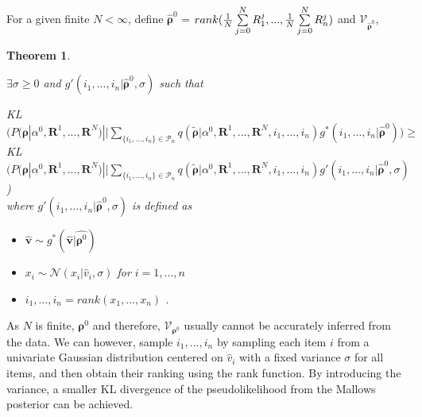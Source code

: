 \documentclass[11pt, oneside]{article}   	%
\newtheorem{theorem}{Theorem}[subsection]
\begin{document}
\subsection{ }
For a given finite $N < \infty$, define $\hat{\bm{\rho}}^0$ = $rank({1\over N}\sum\limits_{j=0}^{N}R_1^j, ..., {1\over N}\sum\limits_{j=0}^{N}R_n^j)$ and  $\mathcal{V}_{\hat{\bm{\rho}}^0}$, 

\begin{theorem} \label{theorem:gaussiannoise}

$\exists\sigma \geq 0$ and $g'(i_1, ..., i_n|{\hat{\bm{\rho}}^0}, \sigma)$ such that 

 KL $\Big(P(\bm{\rho}|\alpha^0, \bm{R}^1, ...,\bm{R}^N ) || \sum\limits_{\{i_1,..., i_n\} \in \mathcal{P}_n} q (\tilde{\bm{\rho}}|\alpha^0, \bm{R}^1,..., \bm{R}^N, i_1,...,i_n) g^{*}(i_1,...,i_n|{\hat{\bm{\rho}}^0})\Big)\geq $\\
 KL $\Big(P(\bm{\rho}|\alpha^0, \bm{R}^1, ...,\bm{R}^N ) || \sum\limits_{\{i_1,..., i_n\} \in \mathcal{P}_n} q (\tilde{\bm{\rho}}|\alpha^0, \bm{R}^1,..., \bm{R}^N, i_1,...,i_n) g'(i_1,...,i_n|{\hat{\bm{\rho}}^0}, \sigma)$\Big)\\

 where 
 $g'(i_1, ..., i_n|{\hat{\bm{\rho}}^0}, \sigma) $ is defined as 
 \begin{itemize}
 	\item {$\hat{\bm{v}} \sim g^* (\hat{\bm{v}}|{\hat{\bm{\rho}^{0}}})$}
  	\item {$x_i\sim \mathcal{N}(x_i|\hat{v}_i, \sigma)$} for $i = 1,...,n $
 	\item {$i_1, ..., i_n = rank(x_1, ..., x_n)$ }. 
 \end{itemize}
 	
\end{theorem} 
As $N$ is finite, $\bm{\rho}^0$ and therefore, $\mathcal{V}_{\bm{\rho}^0}$ usually cannot be accurately inferred from the data. We can however, sample $i_1, ..., i_n$ by sampling each item $i$ from a univariate Gaussian distribution centered on $\hat{v}_i$ with a fixed variance $\sigma$ for all items, and then obtain their ranking using the rank function. By introducing the variance, a smaller KL divergence of the pseudolikelihood from the Mallows posterior can be achieved.
 
\end{document}
